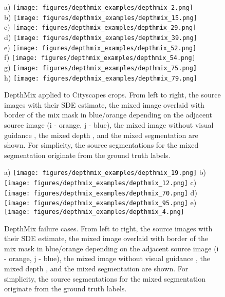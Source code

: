 \documentclass[final]{cvpr}
\begin{document}
\begin{figure*}
    \centering
    a) \texttt{[image: figures/depthmix\_examples/depthmix\_2.png]}\\
    b) \texttt{[image: figures/depthmix\_examples/depthmix\_15.png]}\\
    c) \texttt{[image: figures/depthmix\_examples/depthmix\_29.png]}\\
    d) \texttt{[image: figures/depthmix\_examples/depthmix\_39.png]}\\
    e) \texttt{[image: figures/depthmix\_examples/depthmix\_52.png]}\\
    f) \texttt{[image: figures/depthmix\_examples/depthmix\_54.png]}\\
    g) \texttt{[image: figures/depthmix\_examples/depthmix\_75.png]}\\
    h) \texttt{[image: figures/depthmix\_examples/depthmix\_79.png]}\\
    \caption{DepthMix applied to Cityscapes crops. From left to right, the source images with their SDE estimate, the mixed image  overlaid with border of the mix mask  in blue/orange depending on the adjacent source image (i - orange, j - blue), the mixed image without visual guidance , the mixed depth , and the mixed segmentation  are shown. For simplicity, the source segmentations for the mixed segmentation  originate from the ground truth labels.}
    \label{fig:depthmix_examples}
\end{figure*}

\begin{figure*}
    \centering
    a) \texttt{[image: figures/depthmix\_examples/depthmix\_19.png]}
    b) \texttt{[image: figures/depthmix\_examples/depthmix\_12.png]}
    c) \texttt{[image: figures/depthmix\_examples/depthmix\_70.png]}
    d) \texttt{[image: figures/depthmix\_examples/depthmix\_95.png]}
    e) \texttt{[image: figures/depthmix\_examples/depthmix\_4.png]}
    \caption{DepthMix failure cases. From left to right, the source images with their SDE estimate, the mixed image  overlaid with border of the mix mask  in blue/orange depending on the adjacent source image (i - orange, j - blue), the mixed image without visual guidance , the mixed depth , and the mixed segmentation  are shown. For simplicity, the source segmentations for the mixed segmentation  originate from the ground truth labels.}
    \label{fig:depthmix_failure_cases}
\end{figure*}

 
\end{document}
